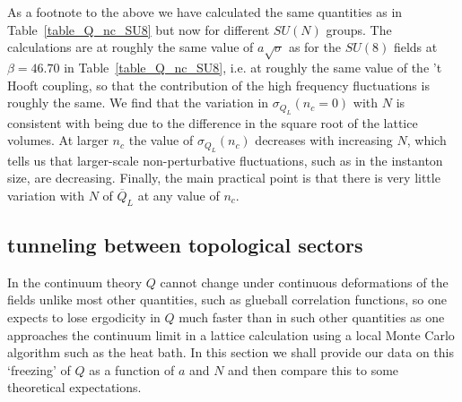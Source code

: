 \documentclass[12pt]{article}
\begin{document}
As a footnote to the above we have calculated the same quantities as in
Table~\ref{table_Q_nc_SU8} but now for different $SU(N)$ groups. The calculations are at
roughly the same value of $a\surd\sigma$ as for the $SU(8)$ fields at $\beta=46.70$ in
Table~\ref{table_Q_nc_SU8}, i.e. at roughly the same value of the 't Hooft coupling, so that
the contribution of the high frequency fluctuations is roughly the same. We find that the
variation in  $\sigma_{Q_L}(n_c=0)$ with $N$ is consistent with being due to the difference
in the square root of the lattice volumes. At larger $n_c$ the value of $\sigma_{Q_L}(n_c)$
decreases with increasing $N$, which tells us that larger-scale non-perturbative fluctuations,
such as in the instanton size, are decreasing. Finally, the main practical point is that there
is very little variation with $N$ of $\overline{Q}_L$ at any value of $n_c$.





%
%
\subsection{tunneling between topological sectors}
\label{subsection_Qtunneling} 

In the continuum theory $Q$ cannot change under continuous deformations of the fields
unlike most other quantities, such as glueball correlation functions, so one expects to lose
ergodicity in $Q$ much faster than in such other quantities as one approaches the continuum
limit in a lattice calculation using a local Monte Carlo algorithm such as the heat bath.
In this section we shall provide our data on this `freezing' of $Q$ as a function
of $a$ and $N$ and then compare this to some theoretical expectations.
\end{document}
